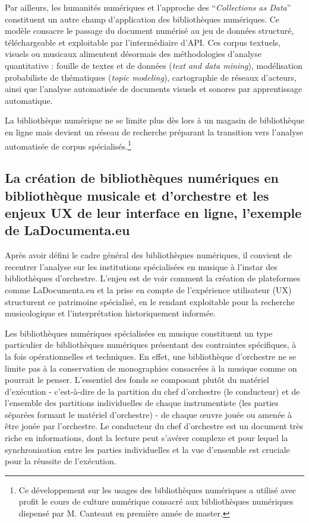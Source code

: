 Par ailleurs, les humanités numériques et l'approche des \enquote{\textit{Collections as Data}} constituent un autre champ d'application des bibliothèques numériques. Ce modèle consacre le passage du document numérisé au jeu de données structuré, téléchargeable et exploitable par l'intermédiaire d'API. Ces corpus textuels, visuels ou musicaux alimentent désormais des méthodologies d'analyse quantitative : fouille de textes et de données (\textit{text and data mining}), modélisation probabiliste de thématiques (\textit{topic modeling}), cartographie de réseaux d'acteurs, ainsi que l'analyse automatisée de documents visuels et sonores par apprentissage automatique.

La bibliothèque numérique ne se limite plus dès lors à un magasin de bibliothèque en ligne mais devient un réseau de recherche préparant la transition vers l'analyse automatisée de corpus spécialisés.\footnote{Ce développement sur les usages des bibliothèques numériques a utilisé avec profit le cours de culture numérique consacré aux bibliothèques numériques dispensé par M. Canteaut en première année de master. }


\subsection*{La création de bibliothèques numériques en bibliothèque musicale et d'orchestre et les enjeux UX de leur interface en ligne, l'exemple de LaDocumenta.eu}

Après avoir défini le cadre général des bibliothèques numériques, il convient de recentrer l'analyse sur les institutions spécialisées en musique à l'instar des bibliothèques d'orchestre. L'enjeu est de voir comment la création de plateformes comme LaDocumenta.eu et la prise en compte de l'expérience utilisateur (UX) structurent ce patrimoine spécialisé, en le rendant exploitable pour la recherche musicologique et l'interprétation historiquement informée.  

Les bibliothèques numériques spécialisées en musique constituent un type particulier de bibliothèques numériques présentant des contraintes spécifiques, à la fois opérationnelles et techniques. En effet, une bibliothèque d'orchestre ne se limite pas à la conservation de monographies consacrées à la musique comme on pourrait le penser. L'essentiel des fonds se composant plutôt du matériel d'exécution - c'est-à-dire de la partition du chef d'orchestre (le conducteur) et de l'ensemble des partitions individuelles de chaque instrumentiste  (les parties séparées formant le matériel d'orchestre) - de chaque œuvre jouée ou amenée à être jouée par l'orchestre. Le conducteur du chef d’orchestre est un document très riche en informations, dont la lecture peut s’avérer complexe  et pour lequel la synchronisation entre les parties individuelles et la vue d’ensemble est cruciale pour la réussite de l’exécution.

